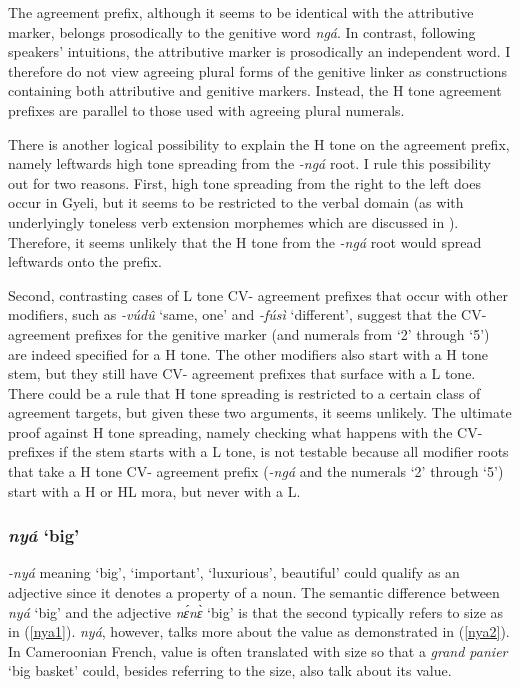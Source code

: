 The agreement prefix, although it seems to be identical with the attributive marker, belongs prosodically to the genitive word {\itshape ngá}. In contrast, following speakers' intuitions, the attributive marker is prosodically an independent word. I therefore do not view agreeing plural forms of the genitive linker  as constructions containing both attributive and genitive markers. Instead, the H tone agreement prefixes are parallel to those used with agreeing plural numerals.

There is another logical possibility to explain the H tone on the agreement prefix, namely leftwards high tone spreading from the {\itshape -ngá} root. I rule this possibility out for two reasons.
First, high tone spreading from the right to the left does occur in Gyeli, but it seems to be restricted to the verbal domain (as with underlyingly toneless verb extension morphemes which are discussed in ). Therefore, it seems unlikely that the H tone from the {\itshape -ngá} root would spread leftwards onto the prefix.

Second, contrasting cases of L tone CV- agreement prefixes that occur with other modifiers, such as {\itshape -vúdû} `same, one' and {\itshape -fúsì} `different', suggest that the CV- agreement prefixes for the genitive marker (and numerals from `2' through `5') are indeed specified for a H tone. The other modifiers also start with a H tone stem, but they still have CV- agreement prefixes that surface with a L tone. There could be a rule that H tone spreading is restricted to a certain class of agreement targets, but given these two arguments, it seems unlikely. The ultimate proof against H tone spreading, namely checking what happens with the CV- prefixes if the stem starts with a L tone, is not testable because all modifier roots  that take a H tone CV- agreement prefix ({\itshape -ngá} and the numerals `2' through `5') start with a H or HL mora, but never with a L.



\subsubsection{{\itshape nyá} `big'}
\label{sec:nya}


{\itshape -nyá} meaning `big', `important', `luxurious', beautiful'  could qualify as an adjective since it denotes a property of a noun. The semantic difference between {\itshape nyá} `big' and the adjective {\itshape nɛ́nɛ̀} `big' is that the second typically refers to size as in (\ref{nya1}). {\itshape nyá}, however, talks more about the value as demonstrated in (\ref{nya2}). In Cameroonian French, value is often translated with size so that a {\itshape grand panier} `big basket' could, besides referring to the size, also talk about its value.

